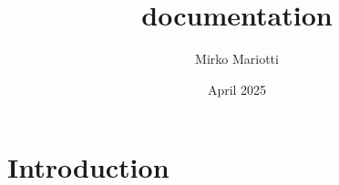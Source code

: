 \documentclass{article}
\title{documentation}
\author{Mirko Mariotti}
\date{April 2025}
\begin{document}
\maketitle

\section{Introduction}
\end{document}
